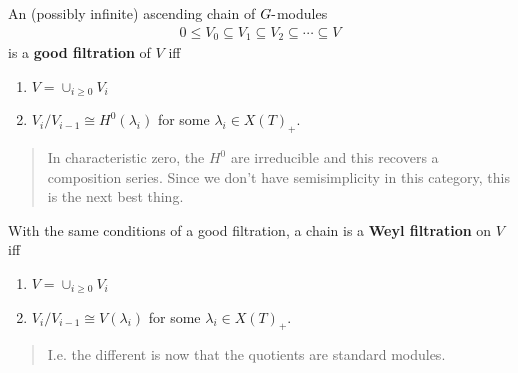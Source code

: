 \begin{definition}

\begin{definition}

An (possibly infinite) ascending chain of \(G{\hbox{-}}\)modules
\begin{align*}   0 \leq V_0 \subseteq V_1 \subseteq V_2 \subseteq \cdots \subseteq V \end{align*}
is a \textbf{good filtration} of \(V\) iff

\begin{enumerate}
\def\labelenumi{\arabic{enumi}.}
\item
  \(V = \cup_{i\geq 0} V_i\)
\item
  \(V_i/V_{i-1} \cong H^0(\lambda_i)\) for some
  \(\lambda_i \in X(T)_+\).
\end{enumerate}

\begin{quote}
In characteristic zero, the \(H^0\) are irreducible and this recovers a
composition series. Since we don't have semisimplicity in this category,
this is the next best thing.
\end{quote}

\end{definition}

\end{definition}

\begin{definition}

\begin{definition}

With the same conditions of a good filtration, a chain is a \textbf{Weyl
filtration} on \(V\) iff

\begin{enumerate}
\def\labelenumi{\arabic{enumi}.}
\item
  \(V = \cup_{i\geq 0} V_i\)
\item
  \(V_i/V_{i-1} \cong V(\lambda_i)\) for some \(\lambda_i \in X(T)_+\).
\end{enumerate}

\begin{quote}
I.e. the different is now that the quotients are standard modules.
\end{quote}

\end{definition}

\end{definition}

